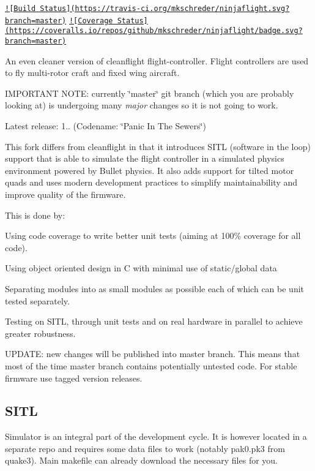 \href{https://travis-ci.org/mkschreder/ninjaflight}{\tt !\mbox{[}Build Status\mbox{]}(https\+://travis-\/ci.\+org/mkschreder/ninjaflight.\+svg?branch=master)} \href{https://coveralls.io/github/mkschreder/ninjaflight?branch=master}{\tt !\mbox{[}Coverage Status\mbox{]}(https\+://coveralls.\+io/repos/github/mkschreder/ninjaflight/badge.\+svg?branch=master)}

An even cleaner version of cleanflight flight-\/controller. Flight controllers are used to fly multi-\/rotor craft and fixed wing aircraft.

I\+M\+P\+O\+R\+T\+A\+N\+T N\+O\+T\+E\+: currently \char`\"{}master\char`\"{} git branch (which you are probably looking at) is undergoing many {\itshape major} changes so it is not going to work.

Latest release\+: 1.. (Codename\+: \char`\"{}\+Panic In The Sewers\char`\"{})

This fork differs from cleanflight in that it introduces S\+I\+T\+L (software in the loop) support that is able to simulate the flight controller in a simulated physics environment powered by Bullet physics. It also adds support for tilted motor quads and uses modern development practices to simplify maintainability and improve quality of the firmware.

This is done by\+:
\begin{DoxyItemize}
\item Using code coverage to write better unit tests (aiming at 100\% coverage for all code).
\item Using object oriented design in C with minimal use of static/global data
\item Separating modules into as small modules as possible each of which can be unit tested separately.
\item Testing on S\+I\+T\+L, through unit tests and on real hardware in parallel to achieve greater robustness.
\end{DoxyItemize}

U\+P\+D\+A\+T\+E\+: new changes will be published into master branch. This means that most of the time master branch contains potentially untested code. For stable firmware use tagged version releases.

\subsection*{S\+I\+T\+L}

Simulator is an integral part of the development cycle. It is however located in a separate repo and requires some data files to work (notably pak0.\+pk3 from quake3). Main makefile can already download the necessary files for you.


